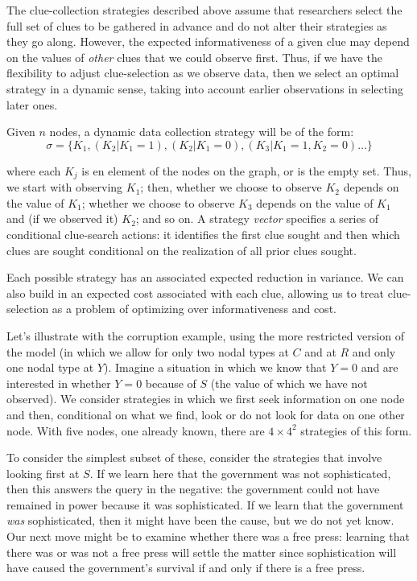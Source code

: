 \documentclass[
  12pt,
]{book}
\begin{document}
The clue-collection strategies described above assume that researchers select the full set of clues to be gathered in advance and do not alter their strategies as they go along. However, the expected informativeness of a given clue may depend on the values of \emph{other} clues that we could observe first. Thus, if we have the flexibility to adjust clue-selection as we observe data, then we select an optimal strategy in a dynamic sense, taking into account earlier observations in selecting later ones.

Given \(n\) nodes, a dynamic data collection strategy will be of the form:
\[\sigma = \{K_1, (K_2|K_1 = 1), (K_2|K_1 = 0), (K_3|K_1=1, K_2 =0)\dots\}\]

where each \(K_j\) is en element of the nodes on the graph, or is the empty set. Thus, we start with observing \(K_1\); then, whether we choose to observe \(K_2\) depends on the value of \(K_1\); whether we choose to observe \(K_3\) depends on the value of \(K_1\) and (if we observed it) \(K_2\); and so on. A strategy \emph{vector} specifies a series of conditional clue-search actions: it identifies the first clue sought and then which clues are sought conditional on the realization of all prior clues sought.

Each possible strategy has an associated expected reduction in variance. We can also build in an expected cost associated with each clue, allowing us to treat clue-selection as a problem of optimizing over informativeness and cost.

Let's illustrate with the corruption example, using the more restricted version of the model (in which we allow for only two nodal types at \(C\) and at \(R\) and only one nodal type at \(Y\)). Imagine a situation in which we know that \(Y=0\) and are interested in whether \(Y=0\) because of \(S\) (the value of which we have not observed). We consider strategies in which we first seek information on one node and then, conditional on what we find, look or do not look for data on one other node. With five nodes, one already known, there are \(4 \times 4^2\) strategies of this form.

To consider the simplest subset of these, consider the strategies that involve looking first at \(S\). If we learn here that the government was not sophisticated, then this answers the query in the negative: the government could not have remained in power because it was sophisticated. If we learn that the government \emph{was} sophisticated, then it might have been the cause, but we do not yet know. Our next move might be to examine whether there was a free press: learning that there was or was not a free press will settle the matter since sophistication will have caused the government's survival if and only if there is a free press.
\end{document}
